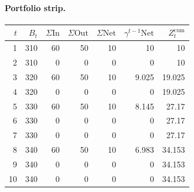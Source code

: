 \documentclass[12pt, a4paper]{article}
\begin{document}
\paragraph{Portfolio strip.}
\begin{center}
\begin{tabular}{rrrrrrr}
\toprule
$t$ & $B_t$ & $\Sigma\mathrm{In}$ & $\Sigma\mathrm{Out}$ & $\Sigma\mathrm{Net}$ & $\gamma^{t-1}\mathrm{Net}$ & $Z_t^{\mathrm{cum}}$\\
\midrule
1 & 310 & 60 & 50 & 10 & 10 & 10 \\
2 & 310 & 0 & 0 & 0 & 0 & 10 \\
3 & 320 & 60 & 50 & 10 & 9.025 & 19.025 \\
4 & 320 & 0 & 0 & 0 & 0 & 19.025 \\
5 & 330 & 60 & 50 & 10 & 8.145 & 27.17 \\
6 & 330 & 0 & 0 & 0 & 0 & 27.17 \\
7 & 330 & 0 & 0 & 0 & 0 & 27.17 \\
8 & 340 & 60 & 50 & 10 & 6.983 & 34.153 \\
9 & 340 & 0 & 0 & 0 & 0 & 34.153 \\
10 & 340 & 0 & 0 & 0 & 0 & 34.153 \\
\bottomrule
\end{tabular}
\end{center}
\end{document}
